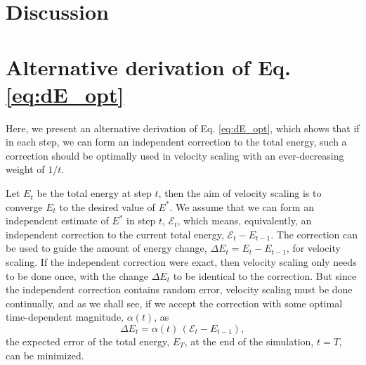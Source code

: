 \documentclass[reprint]{revtex4-1}
\begin{document}
\section{Discussion}





\appendix


\section{\label{sec:error}
  Alternative derivation of Eq. \eqref{eq:dE_opt}
}


Here, we present an alternative derivation of Eq. \eqref{eq:dE_opt},
which shows that if in each step, we can form an independent correction
to the total energy, such a correction should be optimally used
in velocity scaling with an ever-decreasing weight of $1/t$.

Let $E_t$ be the total energy at step $t$,
then the aim of velocity scaling is to converge $E_t$
to the desired value of $E^*$.
%
We assume that we can form an independent estimate of $E^*$
in step $t$, $\mathcal E_t$,
which means, equivalently, an independent correction
to the current total energy, $\mathcal E_t - E_{t-1}$.
%
The correction can be used to guide the amount of
energy change, $\Delta E_t = E_t - E_{t-1}$,
for velocity scaling.
%
If the independent correction were exact,
then velocity scaling only needs to be done once,
with the change $\Delta E_t$ to be identical to the correction.
%
But since the independent correction contains random error,
velocity scaling must be done continually,
and as we shall see,
if we accept the correction with some
optimal time-dependent magnitude, $\alpha(t)$, as
%
\begin{equation}
  \Delta E_t = \alpha(t) \, \left( \mathcal E_t - E_{t - 1} \right)
  ,
  \label{eq:Eupdate}
\end{equation}
%
the expected error of the total energy, $E_T$,
at the end of the simulation, $t = T$, can be minimized.
\end{document}
